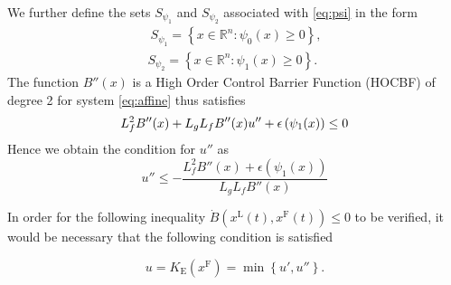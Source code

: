 We further define the sets $S_{\psi_1}$ and $ S_{\psi_2} $ associated with \eqref{eq:psi} in the form
%
\begin{align} \
	S_{\psi_1} =\left\{{x} \in \mathbb{R}^n: \psi_0({x}) \geq 0\right\}, \\
	S_{\psi_2} =\left\{{x} \in \mathbb{R}^n: \psi_1({x}) \geq 0\right\}.
\end{align}
%
The function $B''(x)$ is a High Order Control Barrier Function (HOCBF) of degree 2 for system \eqref{eq:affine} thus satisfies
%
\begin{equation}
	L_f^2 B''(x)+L_g L_f B''(x) u'' \\
	+\epsilon\left(\psi_{1}(x)\right) \leq 0
\end{equation}
Hence we obtain the condition for $u''$ as
\begin{equation}
	u'' \leq - \frac{L_f^2 B''(x)+\epsilon\left(\psi_{1}(x)\right)}{L_g L_f B''(x)}
\end{equation}

In order for the following inequality $\dot{B}\left(x^\mathrm{L}\left(t\right),x^\mathrm{F}\left(t\right)\right) \leq 0$ to be verified, it would be necessary that the following condition  is satisfied

\begin{equation}
	u=K_{\mathrm{E}}\left({x}^{\mathrm{F}}\right) = \min\left\{u',u''\right\}.
\end{equation}